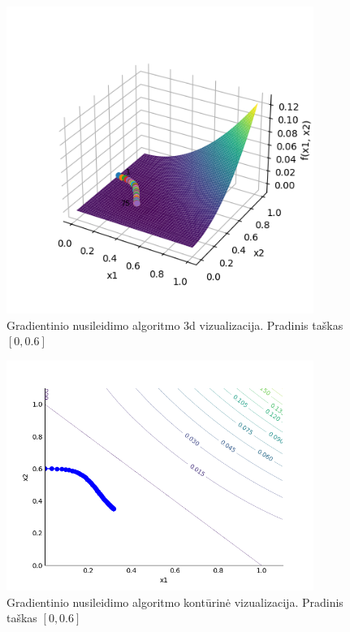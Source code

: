 \documentclass{VUMIFPSkursinis}
\begin{document}
\begin{figure}[H]
  \centering
  \includegraphics[width=10cm]{img/gradient_descent_3d_[0.0,0.6].png}
  \caption{Gradientinio nusileidimo algoritmo 3d vizualizacija. Pradinis taškas $[0, 0.6]$}
  \label{img:grad-des-3d-69}
\end{figure}

\begin{figure}[H]
  \centering
  \includegraphics[width=10cm]{img/gradient_descent_contour_[0.0,0.6].png}
  \caption{Gradientinio nusileidimo algoritmo kontūrinė vizualizacija. Pradinis taškas $[0, 0.6]$}
  \label{img:grad-des-co-69}
\end{figure}
\end{document}

